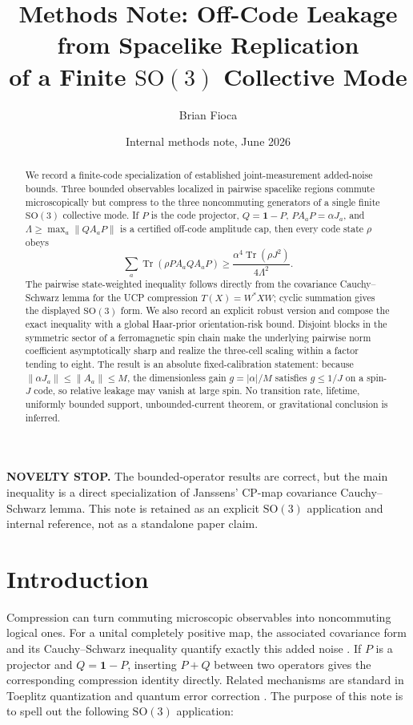 \documentclass[11pt]{article}
\title{Methods Note: Off-Code Leakage from Spacelike Replication\\
of a Finite $\mathrm{SO}(3)$ Collective Mode}
\author{Brian Fioca}
\date{Internal methods note, June 2026}
\theoremstyle{remark}
\newcommand{\1}{\mathbf 1}
\newcommand{\Tr}{\operatorname{Tr}}
\newcommand{\SO}{\mathrm{SO}(3)}
\begin{document}
\maketitle

\begin{center}
\small
\textbf{NOVELTY STOP.}
The bounded-operator results are correct, but the main inequality is a direct
specialization of Janssens' CP-map covariance Cauchy--Schwarz lemma. This note
is retained as an explicit $\SO$ application and internal reference, not as a
standalone paper claim.
\end{center}

\begin{abstract}
We record a finite-code specialization of established joint-measurement
added-noise bounds. Three bounded observables localized in
pairwise spacelike regions commute microscopically but compress to the three
noncommuting generators of a single finite $\SO$ collective mode. If $P$ is
the code projector, $Q=\1-P$, $P A_aP=\alpha J_a$, and
$\Lambda\geq\max_a\lVert Q A_aP\rVert$ is a certified off-code amplitude
cap, then every code state $\rho$ obeys
\[
  \sum_a \Tr(\rho P A_aQ A_aP)
  \geq \frac{\alpha^4\Tr(\rho J^2)}{4\Lambda^2}.
\]
The pairwise state-weighted inequality follows directly from the covariance
Cauchy--Schwarz lemma for the UCP compression $T(X)=W^*XW$; cyclic summation
gives the displayed $\SO$ form. We also record an explicit robust version and
compose the exact inequality with a global Haar-prior orientation-risk bound.
Disjoint blocks in the symmetric sector of a ferromagnetic spin chain make
the underlying pairwise norm coefficient asymptotically sharp and realize
the three-cell scaling within a factor tending to eight. The result is an
absolute fixed-calibration statement: because
$\lVert\alpha J_a\rVert\leq\lVert A_a\rVert\leq M$, the dimensionless gain
$g=|\alpha|/M$ satisfies $g\leq 1/J$ on a spin-$J$ code, so relative leakage
may vanish at large spin. No transition rate, lifetime, uniformly bounded
support, unbounded-current theorem, or gravitational conclusion is inferred.
\end{abstract}

\section{Introduction}
\label{sec:introduction}

Compression can turn commuting microscopic observables into noncommuting
logical ones. For a unital completely positive map, the associated covariance
form and its Cauchy--Schwarz inequality quantify exactly this added noise
\cite{janssens2017,polterovich2014}. If $P$ is a projector and $Q=\1-P$,
inserting $P+Q$ between two operators gives the corresponding compression
identity directly. Related mechanisms are standard in Toeplitz quantization
and quantum error correction \cite{bordemann1994,beny2009,faist2020}. The
purpose of this note is to spell out the following $\SO$ application:
\end{document}
